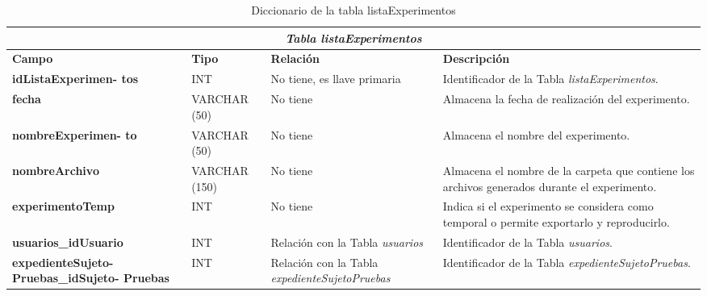 \begin{table}[H]
\begin{center}
\begin{tabular}{||p{4cm}|p{}|p{}|p{5cm}||}
\hline
\multicolumn{4}{||c||}{\textit{\textbf{Tabla listaExperimentos}}}\\
\hline 
\cellcolor{lightgray}\textbf{Campo} & \cellcolor{lightgray}\textbf{Tipo} & \cellcolor{lightgray}\textbf{Relación} & \cellcolor{lightgray}\textbf{Descripción} \\ \hline 
\textbf{idListaExperimen- tos} & {INT} & {No tiene, es llave primaria} & {Identificador de la Tabla \textit{listaExperimentos}.} \\ \hline
\textbf{fecha} & {VARCHAR (50)} & {No tiene} & {Almacena la fecha de realización del experimento.} \\ \hline
\textbf{nombreExperimen- to} & {VARCHAR (50)} & {No tiene} & {Almacena el nombre del experimento.} \\ \hline
\textbf{nombreArchivo} & {VARCHAR (150)} & {No tiene} & {Almacena el nombre de la carpeta que contiene los archivos generados durante el experimento.} \\ \hline
\textbf{experimentoTemp} & {INT} & {No tiene} & {Indica si el experimento se considera como temporal o permite exportarlo y reproducirlo.} \\ \hline
\textbf{usuarios\_idUsuario} & {INT} & {Relación con la Tabla \textit{usuarios}} & {Identificador de la Tabla \textit{usuarios}.} \\ \hline
\textbf{expedienteSujeto- Pruebas\_idSujeto- Pruebas} & {INT} & {Relación con la Tabla \textit{expedienteSujetoPruebas}} & {Identificador de la Tabla \textit{expedienteSujetoPruebas}.} \\ \hline
\end{tabular}
\caption{Diccionario de la tabla listaExperimentos}
\label{Tabla:listaExperimentos}
\end{center}
\end{table}


